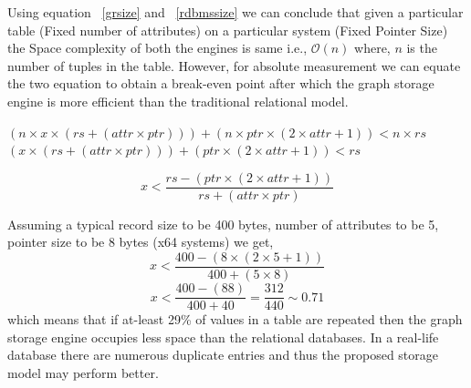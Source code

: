 \documentclass[12pt, oneside]{book}
\begin{document}
\par
Using equation ~\ref{grsize} and ~\ref{rdbmssize} we can conclude that given a particular table (Fixed number of attributes) on a particular system (Fixed Pointer Size) the Space complexity of both the engines is same i.e., $\mathcal{O}\left( n\right)$ where, $n$ is the number of tuples in the table. However, for absolute measurement we can equate the two equation to obtain a break-even point after which the graph storage engine is more efficient than the traditional relational model.
\begin{center}
  \begin{math}
    (n \times x \times (rs + (attr \times ptr)) ) + (n \times ptr \times (2 \times attr + 1 )) < n \times rs
  \end{math}\\
  \begin{math}
    ( x \times ( rs + ( attr \times ptr ) ) ) + ( ptr \times (2 \times attr + 1 )) < rs
  \end{math}
\end{center}
\[
 x  < \frac{ rs - ( ptr \times (2 \times attr + 1 )) }{rs + ( attr \times ptr )}
\]

Assuming a typical record size to be 400 bytes, number of attributes to be 5, pointer size to be 8 bytes (x64 systems) we get,
\[
 x < \frac{400 - (8 \times (2 \times 5 + 1))}{400 + (5 \times 8)}
\]
\[
 x < \frac{400 - (88)}{400 + 40} = \frac{312}{440} \sim 0.71
\]
which means that if at-least 29\% of values in a table are repeated then the graph storage engine occupies less space than the relational databases. In a real-life database there are numerous duplicate entries and thus the proposed storage model may perform better.
\end{document}
